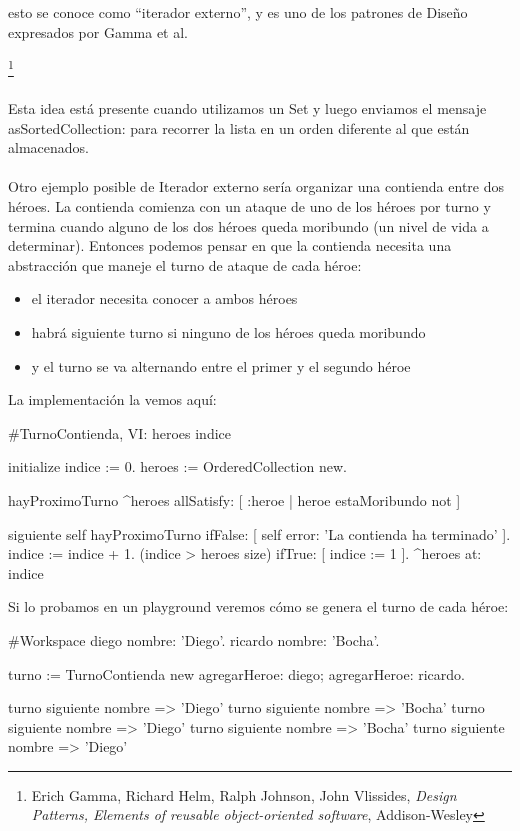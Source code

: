 \documentclass[a4paper,12pt]{book}
\begin{document}
esto se conoce como ``iterador externo'', y es uno de los patrones de Diseño expresados por Gamma et al.{\footnote{
Erich Gamma, Richard Helm, Ralph Johnson, John Vlissides, \textit{Design Patterns, Elements of reusable 
object-oriented software}, Addison-Wesley}
\\
\\
Esta idea está presente cuando utilizamos un Set y luego enviamos el mensaje asSortedCollection: para recorrer
la lista en un orden diferente al que están almacenados. 
\\
\\
Otro ejemplo posible de Iterador externo sería organizar una contienda entre dos héroes. La contienda comienza
con un ataque de uno de los héroes por turno y termina cuando alguno de los dos héroes queda moribundo
(un nivel de vida a determinar). Entonces podemos pensar en que la contienda necesita una abstracción que
maneje el turno de ataque de cada héroe:

\begin{itemize}
 \item el iterador necesita conocer a ambos héroes
 \item habrá siguiente turno si ninguno de los héroes queda moribundo
 \item y el turno se va alternando entre el primer y el segundo héroe
\end{itemize}

La implementación la vemos aquí:

\begin{code}
#TurnoContienda, VI: heroes indice

initialize
   indice := 0.
   heroes := OrderedCollection new.
   
hayProximoTurno
   ^heroes allSatisfy: [ :heroe | heroe estaMoribundo not ]
   
siguiente
   self hayProximoTurno 
        ifFalse: [ self error: 'La contienda ha terminado' ].
   indice := indice + 1.
   (indice > heroes size) ifTrue: [ indice := 1 ].
   ^heroes at: indice
\end{code}

Si lo probamos en un playground veremos cómo se genera el turno de cada héroe:

\begin{code}
#Workspace
diego nombre: 'Diego'.
ricardo nombre: 'Bocha'.

turno := TurnoContienda new 
   agregarHeroe: diego;
   agregarHeroe: ricardo.

turno siguiente nombre => 'Diego'
turno siguiente nombre => 'Bocha'
turno siguiente nombre => 'Diego'
turno siguiente nombre => 'Bocha'
turno siguiente nombre => 'Diego'
\end{code}

}
\end{document}
